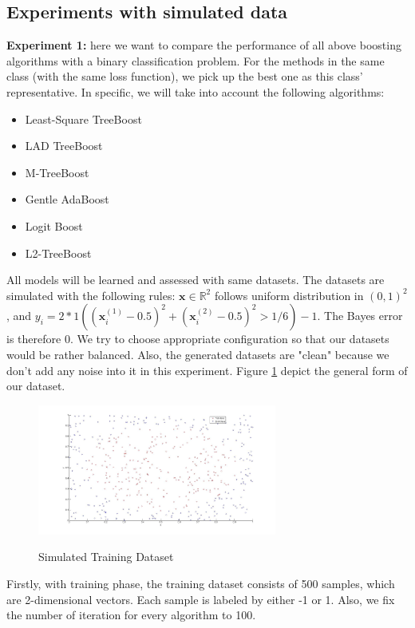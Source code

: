 \documentclass[a4paper,twoside,12pt]{article}
\begin{document}
\subsection{Experiments with simulated data}
\textbf{Experiment 1:} here we want to compare the performance of all above boosting algorithms with a binary classification problem. For the methods in the same class (with the same loss function), we pick up the best one as this class' representative. In specific, we will take into account the following algorithms:
\begin{itemize}
	\item Least-Square TreeBoost
	\item LAD TreeBoost
	\item M-TreeBoost
	\item Gentle AdaBoost
	\item Logit Boost
	\item L2-TreeBoost
\end{itemize}
All models will be learned and assessed with same datasets. The datasets are simulated with the following rules: $\textbf{x} \in \mathbb{R}^2$ follows uniform distribution in $(0, 1)^2$, and $y_i = 2*1((\textbf{x}_i^{(1)} - 0.5)^2 + (\textbf{x}_i^{(2)} - 0.5)^2 > 1/6) - 1$. The Bayes error is therefore $0$. We try to choose appropriate configuration so that our datasets would be rather balanced. Also, the generated datasets are "clean" because we don't add any noise into it in this experiment. Figure \ref{fig:simulated_data} depict the general form of our dataset.
\begin{figure}[H]
\centering
\caption{Simulated Training Dataset}
\includegraphics[width = 0.7\textwidth]{Figures/simulated_dataset}
\label{fig:simulated_data}
\end{figure}
Firstly, with training phase, the training dataset consists of 500 samples, which are 2-dimensional vectors. Each sample is labeled by either -1 or 1. Also, we fix the number of iteration for every algorithm to 100.\\
\end{document}
